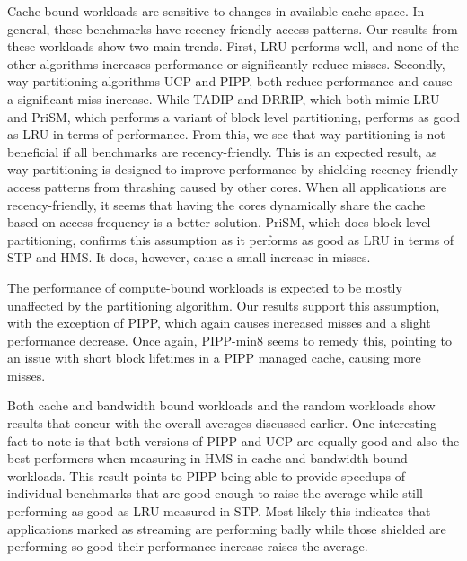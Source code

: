 Cache bound workloads are sensitive to changes in available cache space.
In general, these benchmarks have recency-friendly access patterns.
Our results from these workloads show two main trends.
First, LRU performs well, and none of the other algorithms increases performance or significantly reduce misses.
Secondly, way partitioning algorithms UCP and PIPP, both reduce performance and cause a significant miss increase. 
While TADIP and DRRIP, which both mimic LRU and PriSM, which performs a variant of block level partitioning, performs as good as LRU in terms of performance.
From this, we see that way partitioning is not beneficial if all benchmarks are recency-friendly.
This is an expected result, as way-partitioning is designed to improve performance by shielding recency-friendly access patterns from thrashing caused by other cores.
When all applications are recency-friendly, it seems that having the cores dynamically share the cache based on access frequency is a better solution.
PriSM, which does block level partitioning, confirms this assumption as it performs as good as LRU in terms of STP and HMS.
It does, however, cause a small increase in misses.

The performance of compute-bound workloads is expected to be mostly unaffected by the partitioning algorithm. 
Our results support this assumption, with the exception of PIPP, which again causes increased misses and a slight performance decrease.
Once again, PIPP-min8 seems to remedy this, pointing to an issue with short block lifetimes in a PIPP managed cache, causing more misses.

Both cache and bandwidth bound workloads and the random workloads show results that concur with the overall averages discussed earlier.
One interesting fact to note is that both versions of PIPP and UCP are equally good and also the best performers when measuring in HMS in cache and bandwidth bound workloads.
This result points to PIPP being able to provide speedups of individual benchmarks that are good enough to raise the average while still performing as good as LRU measured in STP.
Most likely this indicates that applications marked as streaming are performing badly while those shielded are performing so good their performance increase raises the average.

